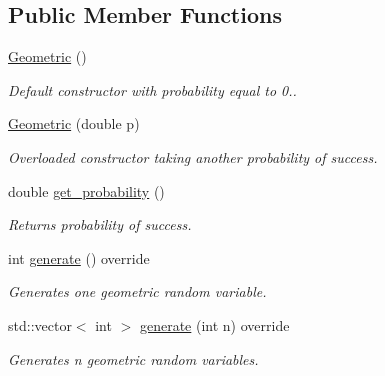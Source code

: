 \subsection*{Public Member Functions}
\begin{DoxyCompactItemize}
\item 
\mbox{\label{class_geometric_a741e184fee4d9abdeb2f565870eba117}} 
\hyperlink{class_geometric_a741e184fee4d9abdeb2f565870eba117}{Geometric} ()
\begin{DoxyCompactList}\small\item\em Default constructor with probability equal to 0.. \end{DoxyCompactList}\item 
\mbox{\label{class_geometric_a4e85b6271700782d644f56c5b90b4966}} 
\hyperlink{class_geometric_a4e85b6271700782d644f56c5b90b4966}{Geometric} (double p)
\begin{DoxyCompactList}\small\item\em Overloaded constructor taking another probability of success. \end{DoxyCompactList}\item 
\mbox{\label{class_geometric_a486dd9216795ae5ecd3579598c62632c}} 
double \hyperlink{class_geometric_a486dd9216795ae5ecd3579598c62632c}{get\+\_\+probability} ()
\begin{DoxyCompactList}\small\item\em Returns probability of success. \end{DoxyCompactList}\item 
\mbox{\label{class_geometric_a248e4a0a34c8681a5b3b889a4896a863}} 
int \hyperlink{class_geometric_a248e4a0a34c8681a5b3b889a4896a863}{generate} () override
\begin{DoxyCompactList}\small\item\em Generates one geometric random variable. \end{DoxyCompactList}\item 
\mbox{\label{class_geometric_af1a6be5d5c92415648017a7e5eb87ecd}} 
std\+::vector$<$ int $>$ \hyperlink{class_geometric_af1a6be5d5c92415648017a7e5eb87ecd}{generate} (int n) override
\begin{DoxyCompactList}\small\item\em Generates n geometric random variables. \end{DoxyCompactList}\end{DoxyCompactItemize}
